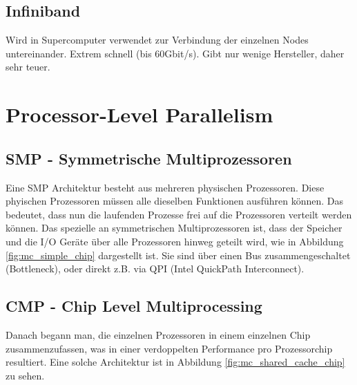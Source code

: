 \subsection{Infiniband}
Wird in Supercomputer verwendet zur Verbindung der einzelnen Nodes untereinander. Extrem schnell (bis 60Gbit/s). Gibt nur wenige Hersteller, daher sehr teuer.
\section{Processor-Level Parallelism}
\subsection{SMP - Symmetrische Multiprozessoren}
Eine SMP Architektur besteht aus mehreren physischen Prozessoren. Diese phyischen Prozessoren müssen alle dieselben Funktionen ausführen können. Das bedeutet, dass nun die laufenden Prozesse frei auf die Prozessoren verteilt werden können.
Das spezielle an symmetrischen Multiprozessoren ist, dass der Speicher und die I/O Geräte über alle Prozessoren hinweg geteilt wird, wie in Abbildung \ref{fig:mc_simple_chip} dargestellt ist. Sie sind über einen Bus zusammengeschaltet (Bottleneck), oder direkt z.B. via QPI (Intel QuickPath Interconnect). 

\subsection{CMP - Chip Level Multiprocessing}
Danach begann man, die einzelnen Prozessoren in einem einzelnen Chip zusammenzufassen, was in einer verdoppelten Performance pro Prozessorchip resultiert. Eine solche Architektur ist in Abbildung \ref{fig:mc_shared_cache_chip} zu sehen. 

